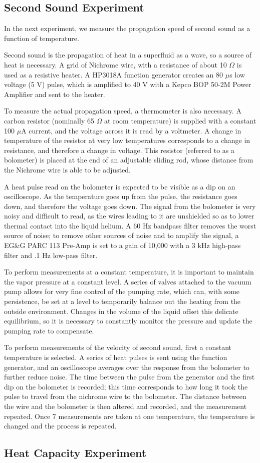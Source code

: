 \subsection{Second Sound Experiment}

In the next experiment, we measure the propagation speed of second sound as a function of temperature.

Second sound is the propagation of heat in a superfluid as a wave, so a source of heat is necessary. A grid of Nichrome wire, with a resistance of about 10 $\Omega$ is used as a resistive heater. A HP3018A function generator creates an 80 $\mu$s low voltage (5 V) pulse, which is amplified to 40 V with a Kepco BOP 50-2M Power Amplifier and sent to the heater. 

To measure the actual propagation speed, a thermometer is also necessary. A carbon resistor (nominally 65 $\Omega$ at room temperature) is supplied with a constant 100 $\mu$A current, and the voltage across it is read by a voltmeter. A change in temperature of the resistor at very low temperatures corresponds to a change in resistance, and therefore a change in voltage. This resistor (referred to as a bolometer) is placed at the end of an adjustable sliding rod, whose distance from the Nichrome wire is able to be adjusted.

A heat pulse read on the bolometer is expected to be visible as a dip on an oscilloscope. As the temperature goes up from the pulse, the resistance goes down, and therefore the voltage goes down. The signal from the bolometer is very noisy and difficult to read, as the wires leading to it are unshielded so as to lower thermal contact into the liquid helium. A 60 Hz bandpass filter removes the worst source of noise; to remove other sources of noise and to amplify the signal, a EG\&G PARC 113 Pre-Amp is set to a gain of 10,000 with a 3 kHz high-pass filter and .1 Hz low-pass filter.

To perform measurements at a constant temperature, it is important to maintain the vapor pressure at a constant level. A series of valves attached to the vacuum pump allows for very fine control of the pumping rate, which can, with some persistence, be set at a level to temporarily balance out the heating from the outside environment. Changes in the volume of the liquid offset this delicate equilibrium, so it is necessary to constantly monitor the pressure and update the pumping rate to compensate.

To perform measurements of the velocity of second sound, first a constant temperature is selected. A series of heat pulses is sent using the function generator, and an oscilloscope averages over the response from the bolometer to further reduce noise. The time between the pulse from the generator and the first dip on the bolometer is recorded; this time corresponds to how long it took the pulse to travel from the nichrome wire to the bolometer. The distance between the wire and the bolometer is then altered and recorded, and the measurement repeated. Once 7 measurements are taken at one temperature, the temperature is changed and the process is repeated.

\subsection{Heat Capacity Experiment}

